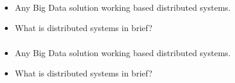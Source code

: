 \begin{frame}
  \frametitle{\subsecname}
	\begin{itemize}[<+->]
		\item Any Big Data solution working based distributed systems.
		\item What is distributed systems in brief?
	\end{itemize}
\end{frame}


\begin{frame}
  \frametitle{\subsecname}
	\begin{itemize}[<+->]
		\item Any Big Data solution working based distributed systems.
		\item What is distributed systems in brief?
	\end{itemize}
\end{frame}


